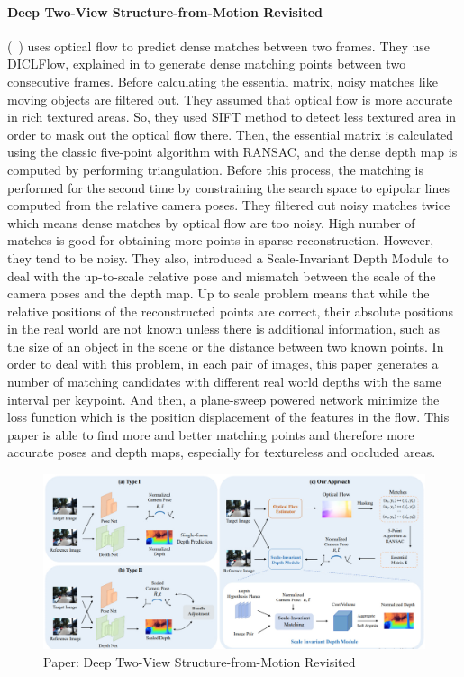 \documentclass[11pt]{article}
\begin{document}
    \paragraph{Deep Two-View Structure-from-Motion Revisited} (~\cite{wang2021deep}) uses optical flow to predict
    dense matches between two frames. They use DICLFlow, explained in \cite{wang2020displacement} to generate
    dense matching points between two consecutive frames. Before calculating the essential matrix, noisy matches
    like moving objects are filtered out. They assumed that optical flow is more accurate in rich textured areas.
    So, they used SIFT method to detect less textured area in order to mask out the optical flow there.
    Then, the essential matrix is calculated using the classic five-point algorithm with RANSAC, and
    the dense depth map is computed by performing triangulation. Before this process, the matching is performed
    for the second time by constraining the search space to epipolar lines computed from the relative camera poses.
    They filtered out noisy matches twice which means dense matches by optical flow are too noisy. High number of matches is good
    for obtaining more points in sparse reconstruction. However, they tend to be noisy. They also,
    introduced a Scale-Invariant Depth Module to deal with the up-to-scale relative pose and mismatch between the
    scale of the camera poses and the depth map. Up to scale problem means that while the
    relative positions of the reconstructed points are correct, their absolute positions in the real world
    are not known unless there is additional information, such as the size of an object in the scene or the
    distance between two known points. In order to deal with this problem, in each pair of images, this paper
    generates a number of matching candidates with different real world depths with the same interval per keypoint.
    And then, a plane-sweep powered network minimize the loss function which is the position displacement of
    the features in the flow. This paper is able to find more and better matching points and therefore more
    accurate poses and depth maps, especially for textureless and occluded areas.

    \begin{figure}
    \caption{Paper: Deep Two-View Structure-from-Motion Revisited}
    \centering
    \includegraphics[width=\textwidth,height=\textheight,keepaspectratio]{images/deep_two_sfm.jpg}
    \end{figure}
\end{document}
